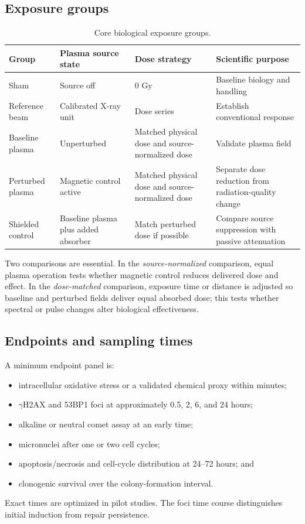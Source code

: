 \subsection{Exposure groups}

\begin{table}[H]
\centering
\caption{Core biological exposure groups.}
\label{tab:bio-groups}
\begin{tabularx}{\textwidth}{lXXX}
\toprule
Group & Plasma source state & Dose strategy & Scientific purpose \\
\midrule
Sham & Source off & 0 Gy & Baseline biology and handling \\
Reference beam & Calibrated X-ray unit & Dose series & Establish conventional response \\
Baseline plasma & Unperturbed & Matched physical dose and source-normalized dose & Validate plasma field \\
Perturbed plasma & Magnetic control active & Matched physical dose and source-normalized dose & Separate dose reduction from radiation-quality change \\
Shielded control & Baseline plasma plus added absorber & Match perturbed dose if possible & Compare source suppression with passive attenuation \\
\bottomrule
\end{tabularx}
\end{table}

Two comparisons are essential. In the \emph{source-normalized} comparison, equal plasma operation tests whether magnetic control reduces delivered dose and effect. In the \emph{dose-matched} comparison, exposure time or distance is adjusted so baseline and perturbed fields deliver equal absorbed dose; this tests whether spectral or pulse changes alter biological effectiveness.

\subsection{Endpoints and sampling times}

A minimum endpoint panel is:
\begin{itemize}
\item intracellular oxidative stress or a validated chemical proxy within minutes;
\item $\gamma$H2AX and 53BP1 foci at approximately 0.5, 2, 6, and 24 hours;
\item alkaline or neutral comet assay at an early time;
\item micronuclei after one or two cell cycles;
\item apoptosis/necrosis and cell-cycle distribution at 24--72 hours; and
\item clonogenic survival over the colony-formation interval.
\end{itemize}
Exact times are optimized in pilot studies. The foci time course distinguishes initial induction from repair persistence.

